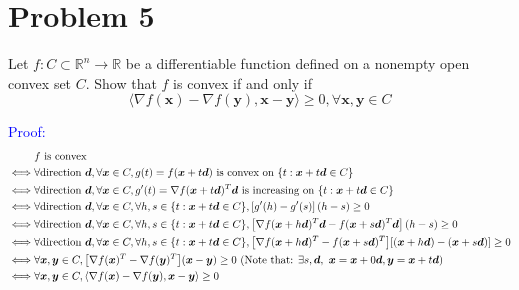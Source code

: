 \documentclass{article}
\def\RR{\mathbb{R}}
\def\bx{\boldsymbol{x}}
\def\by{\boldsymbol{y}}
\def\bd{\boldsymbol{d}}
\def\Eproof{\textcolor{blue}{Proof: }}
\begin{document}
\section*{Problem 5}
Let $f:C\subset\RR^n\to\RR$ be a differentiable function defined on a nonempty open convex set $C$. Show that $f$ is convex if and only if
$$
\langle\nabla f(\bx)-\nabla f(\by),\bx-\by\rangle\ge0, \forall \bx,\by\in C
$$

\Eproof
$$
\begin{aligned}
	&f \mbox{ is convex} 
	\\ \iff
	&
	\forall\mbox{direction } \bd,\forall \bx\in C, g(t)=f(\bx+t\bd) \mbox{ is convex on } \qty{t:\bx+t\bd\in C}
	\\ \iff
	&
	\forall\mbox{direction } \bd,\forall \bx\in C, g'(t)=\nabla f(\bx+t\bd)^T\bd \mbox{ is increasing on } \qty{t:\bx+t\bd\in C}
	\\ \iff
	&
	\forall\mbox{direction } \bd,\forall \bx\in C,\forall h,s\in\qty{t:\bx+t\bd\in C}, \qty[g'(h)-g'(s)](h-s)\ge0
	\\ \iff
	&
	\forall\mbox{direction } \bd,\forall \bx\in C,\forall h,s\in\qty{t:\bx+t\bd\in C}, \qty[\nabla f(\bx+h\bd)^T\bd-f(\bx+s\bd)^T\bd](h-s)\ge0
	\\ \iff
	&
	\forall\mbox{direction } \bd,\forall \bx\in C,\forall h,s\in\qty{t:\bx+t\bd\in C}, \qty[\nabla f(\bx+h\bd)^T-f(\bx+s\bd)^T]\qty[(\bx+h\bd)-(\bx+s\bd)]\ge0
	\\ \iff
	&
	\forall \bx,\by\in C,\qty[\nabla f(\bx)^T-\nabla f(\by)^T]\qty(\bx-\by)\ge0 \mbox{ (Note that: }\exists s,\bd,\ \bx=\bx+0\bd, \by=\bx+t\bd\mbox{)}
	\\ \iff
	&
	\forall \bx,\by\in C,\langle\nabla f(\bx)-\nabla f(\by),\bx-\by\rangle\ge0
\end{aligned}
$$
\end{document}
